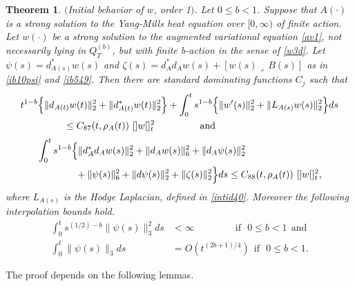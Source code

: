 \documentclass[12pt]{article}
\newtheorem{theorem}{Theorem}[section]
\def \nn{[]}
\def \eref{\eqref}
\def \lrc{\lrcorner\,}
\numberwithin{equation}{section}
\begin{document}
       \begin{theorem}\label{ibord1} $($Initial behavior of $w$, order 1$)$. 
Let  $0 \le b <1$.  Suppose that $A(\cdot)$ is 
a strong solution to the Yang-Mills heat equation over $[0, \infty)$ of finite action. 
Let $w(\cdot)$ be a strong solution to the augmented variational equation \eref{av1},
 not necessarily  lying in $Q_T^{(b)}$, but with finite b-action in the sense  of \eref{w3d}.
Let $\psi(s) = d_{A(s)}^* w(s)$ and  $\zeta(s) = d_A^*d_A w(s) + [w(s)\lrc B(s)]$ as in 
\eref{ib10psi} and \eref{ib549}.
      Then  there are standard dominating  functions $C_j$ such that
\begin{align}
t^{1-b}\Big\{& \| d_{A(t)} w(t)\|_2^2 +\| d_{A(t)}^* w(t)\|_2^2 \Big\}  
         + \int_0^t s^{1-b} \Big\{ \|w'(s) \|_2^2 + \| L_{A(s)} w(s)\|_2^2 \Big\} ds  \notag\\
&\ \ \ \ \ \ \le  C_{87}(t, \rho_A(t))\ \nn w\nn_t^2\ \ \qquad\qquad  \text{and}         \label{ib10b}
\end{align}
\begin{align}
&\int_0^t s^{1-b}\Big\{ \|d_A^* d_A w(s)\|_2^2 + \| d_A w(s)\|_6^2 + \| d_A \psi(s)\|_2^2    \notag\\
&\qquad\qquad  + \| \psi(s)\|_6^2 + \|d\psi(s)\|_2^2+\|\zeta(s)\|_2^2 \Big\} ds  
     \le C_{88}(t, \rho_A(t))\ \nn w\nn_t^2,  \label{ib10ba} 
\end{align}
where $L_{A(s)}$ is the Hodge Laplacian, defined in \eref{intid40}.
Moreover the following interpolation bounds hold.
\begin{align}
\int_0^t s^{(1/2) -b} \|\psi(s)\|_3^2 ds &< \infty \ \qquad\qquad  \text{if}\ \ \  0 \le b <1 
                \ \ \text{and} \label{ib10c}\\
\int_0^t \|\psi(s)\|_3 ds &= O(t^{(2b +1)/4}) \ \ \text{if}\ \ \ 0 \le b <1. \label{ib10d}
\end{align}
\end{theorem}
The proof depends on the following lemmas.
\end{document}
